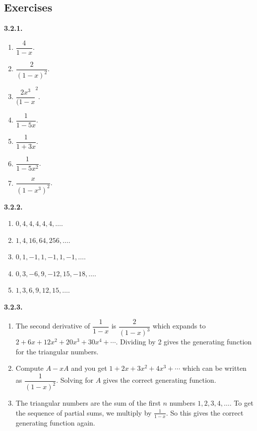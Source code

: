 \documentclass[10pt,]{book}
\theoremstyle{plain}
\theoremstyle{definition}
\theoremstyle{definition}
\theoremstyle{definition}
\theoremstyle{definition}
\numberwithin{equation}{chapter}
\begin{document}
\subsection*{ Exercises}
\noindent\textbf{3.2.1.} \hypertarget{p-1011}{}%
\leavevmode%
\begin{enumerate}[label=(\alph*)]
\item\hypertarget{li-167}{}\(\dfrac{4}{1-x}\).%
\item\hypertarget{li-168}{}\(\dfrac{2}{(1-x)^2}\).%
\item\hypertarget{li-169}{}\(\dfrac{2x^3}{(1-x}^2\).%
\item\hypertarget{li-170}{}\(\dfrac{1}{1-5x}\).%
\item\hypertarget{li-171}{}\(\dfrac{1}{1+3x}\).%
\item\hypertarget{li-172}{}\(\dfrac{1}{1-5x^2}\).%
\item\hypertarget{li-173}{}\(\dfrac{x}{(1-x^3)^2}\).%
\end{enumerate}
%
\par\smallskip
\noindent\textbf{3.2.2.} \hypertarget{p-1014}{}%
\leavevmode%
\begin{enumerate}[label=(\alph*)]
\item\hypertarget{li-179}{}\(0, 4, 4, 4, 4, 4, \ldots\).%
\item\hypertarget{li-180}{}\(1, 4, 16, 64, 256, \ldots\).%
\item\hypertarget{li-181}{}\(0, 1, -1, 1, -1, 1, -1, \ldots\).%
\item\hypertarget{li-182}{}\(0, 3, -6, 9, -12, 15, -18, \ldots\).%
\item\hypertarget{li-183}{}\(1, 3, 6, 9, 12, 15, \ldots\).%
\end{enumerate}
%
\par\smallskip
\noindent\textbf{3.2.3.} \hypertarget{p-1020}{}%
\leavevmode%
\begin{enumerate}[label=(\alph*)]
\item\hypertarget{li-187}{}\hypertarget{p-1021}{}%
The second derivative of \(\dfrac{1}{1-x}\) is \(\dfrac{2}{(1-x)^3}\) which expands to \(2 + 6x + 12x^2 + 20x^3 + 30x^4 + \cdots\).  Dividing by 2 gives the generating function for the triangular numbers.%
\item\hypertarget{li-188}{}\hypertarget{p-1022}{}%
Compute \(A - xA\) and you get \(1 + 2x + 3x^2 + 4x^3 + \cdots\) which can be written as \(\dfrac{1}{(1-x)^2}\).  Solving for \(A\) gives the correct generating function.%
\item\hypertarget{li-189}{}\hypertarget{p-1023}{}%
The triangular numbers are the sum of the first \(n\) numbers  \(1,2,3,4, \ldots\).  To get the sequence of partial sums, we multiply by \(\frac{1}{1-x}\).  So this gives the correct generating function again.%
\end{enumerate}
\end{document}
